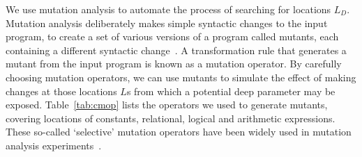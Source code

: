 We use mutation analysis to automate the process of searching for locations
$L_D$. Mutation analysis deliberately makes simple syntactic changes to the
input program, to create a set of various versions of a program called mutants,
each containing a different syntactic change~\cite{5487526}. A
transformation rule that generates a mutant from the input program is known
as a mutation operator. By carefully choosing mutation operators, we can
use mutants to simulate the effect of making changes at those locations $L$s
from which a potential deep parameter may be exposed. 
Table~\ref{tab:cmop} lists the operators we used to generate
mutants, covering locations of constants, relational, logical and
arithmetic expressions. 
These so-called `selective' mutation operators
have been widely used in mutation analysis experiments~\cite{5487526}.

